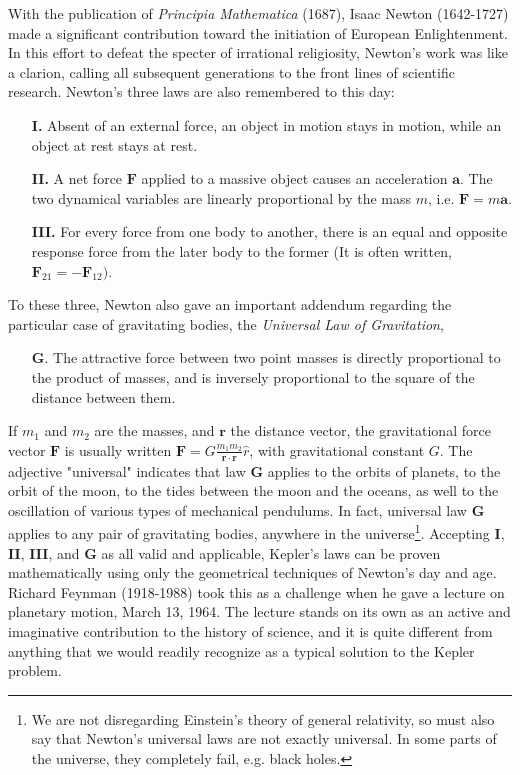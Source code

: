 \documentclass[nofootinbib,preprint]{revtex4-1}
\begin{document}
With the publication of \textit{Principia Mathematica} (1687), Isaac Newton (1642-1727)
made a significant contribution toward the initiation of European Enlightenment.
In this effort to defeat the specter of irrational religiosity, 
Newton's work was like a clarion, calling all subsequent generations to the front lines
of scientific research. Newton's three laws are also remembered to this day:
\begin{itemize}
\item[\textbf{I.} ] Absent of an external force, an object in motion stays in motion, 
while an object at rest stays at rest.  
\item[\textbf{II.} ] A net force $\mathbf{F}$ applied to a massive object causes an 
acceleration $\mathbf{a}$. The two dynamical variables are linearly proportional 
by the mass $m$, i.e. $\mathbf{F} = m \mathbf{a}$.  
\item[\textbf{III.} ] For every force from one body to another, there is an equal 
and opposite response force from the later body to the former (It is often written, 
$\mathbf{F}_{21} = -\mathbf{F}_{12} )$.
\end{itemize}
To these three, Newton also gave an important addendum regarding the particular case of 
gravitating bodies, the \textit{Universal Law of Gravitation}, 
\begin{itemize}
\item[\textbf{G}. ] The attractive force between two point masses is 
directly proportional to the product of masses, and is inversely 
proportional to the square of the distance between them.  
\end{itemize}
If $m_1$ and $m_2$ are the masses, and $\mathbf{r}$ the distance vector, the 
gravitational force vector $\mathbf{F}$ is usually written 
$\mathbf{F} =G \frac{m_1 m_2}{\mathbf{r}\cdot\mathbf{r}}\hat{r}$,
with gravitational constant $G$. The adjective "universal" indicates that law
\textbf{G} applies to the orbits of planets, to the orbit of the moon, to the 
tides between the moon and the oceans, as well to the oscillation of various 
types of mechanical pendulums. In fact, universal law \textbf{G} applies to any 
pair of gravitating bodies, anywhere in the universe\footnote{We are not disregarding Einstein's theory of general relativity, 
so must also say that Newton's universal laws are not exactly universal. 
In some parts of the universe, they completely fail, e.g. black holes.}. Accepting 
\textbf{I}, \textbf{II}, \textbf{III}, and \textbf{G} as all valid and applicable,
Kepler's laws can be proven mathematically using only the geometrical techniques of 
Newton's day and age. Richard Feynman (1918-1988) took this as a challenge when 
he gave a lecture on planetary motion, March 13, 1964. The lecture stands
on its own as an active and imaginative contribution to the history of science, 
and it is quite different from anything that we would readily recognize as a 
typical solution to the Kepler problem. 
\end{document}
